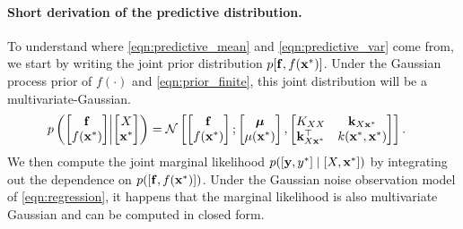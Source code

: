 \paragraph{Short derivation of the predictive distribution.}
To understand where \cref{eqn:predictive_mean} and \cref{eqn:predictive_var} come from, we start by writing the joint prior distribution $p[\mathbf{f}, f(\mathbf{x}^*)]$.
Under the Gaussian process prior of $f(\cdot)$ and \cref{eqn:prior_finite}, this joint distribution will be a multivariate-Gaussian.
%
\begin{align*}
  p \left(
    \begin{bmatrix} \bfn \\ f(\bxtest) \end{bmatrix} \middle|
    \begin{bmatrix} \bX \\ \bxtest \end{bmatrix}
  \right)
  &= \normaldist{
    \begin{bmatrix} \bfn \\ f(\bxtest) \end{bmatrix} ;
    \begin{bmatrix} \bmu \\ \mu(\bxtest) \end{bmatrix}
  }{
    \begin{bmatrix}
      \bK_{\bX \bX}    & \bk_{\bX \bxtest} \\
      \bk_{\bX \bxtest}^\top   & k(\bxtest, \bxtest)
    \end{bmatrix}
  }.
\end{align*}
%
We then compute the joint marginal likelihood $p( [ \mathbf{y}, y^* ] \mid [ X, \mathbf{x}^* ] )$ by integrating out the dependence on $p( [\mathbf{f}, f(\mathbf{x}^*)] )$.
Under the Gaussian noise observation model of \cref{eqn:regression}, it happens that the marginal likelihood is also multivariate Gaussian and can be computed in closed form.
%
